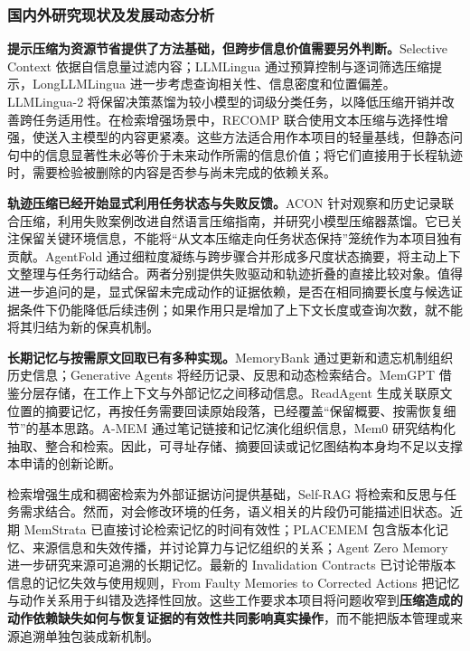 \subsubsection{国内外研究现状及发展动态分析}
\textbf{提示压缩为资源节省提供了方法基础，但跨步信息价值需要另外判断。}Selective Context 依据自信息量过滤内容\cite{selectivecontext}；LLMLingua 通过预算控制与逐词筛选压缩提示\cite{llmlingua}，LongLLMLingua 进一步考虑查询相关性、信息密度和位置偏差\cite{longllmlingua}。LLMLingua-2 将保留决策蒸馏为较小模型的词级分类任务，以降低压缩开销并改善跨任务适用性\cite{llmlingua2}。在检索增强场景中，RECOMP 联合使用文本压缩与选择性增强，使送入主模型的内容更紧凑\cite{recomp}。这些方法适合用作本项目的轻量基线，但静态问句中的信息显著性未必等价于未来动作所需的信息价值；将它们直接用于长程轨迹时，需要检验被删除的内容是否参与尚未完成的依赖关系。

\textbf{轨迹压缩已经开始显式利用任务状态与失败反馈。}ACON 针对观察和历史记录联合压缩，利用失败案例改进自然语言压缩指南，并研究小模型压缩器蒸馏\cite{acon}。它已关注保留关键环境信息，不能将“从文本压缩走向任务状态保持”笼统作为本项目独有贡献。AgentFold 通过细粒度凝练与跨步骤合并形成多尺度状态摘要，将主动上下文整理与任务行动结合\cite{agentfold}。两者分别提供失败驱动和轨迹折叠的直接比较对象。值得进一步追问的是，显式保留未完成动作的证据依赖，是否在相同摘要长度与候选证据条件下仍能降低后续违例；如果作用只是增加了上下文长度或查询次数，就不能将其归结为新的保真机制。

\textbf{长期记忆与按需原文回取已有多种实现。}MemoryBank 通过更新和遗忘机制组织历史信息\cite{memorybank}；Generative Agents 将经历记录、反思和动态检索结合\cite{generativeagents}。MemGPT 借鉴分层存储，在工作上下文与外部记忆之间移动信息\cite{memgpt}。ReadAgent 生成关联原文位置的摘要记忆，再按任务需要回读原始段落\cite{readagent}，已经覆盖“保留概要、按需恢复细节”的基本思路。A-MEM 通过笔记链接和记忆演化组织信息\cite{amem}，Mem0 研究结构化抽取、整合和检索\cite{mem0}。因此，可寻址存储、摘要回读或记忆图结构本身均不足以支撑本申请的创新论断。

检索增强生成和稠密检索为外部证据访问提供基础\cite{rag,dpr}，Self-RAG 将检索和反思与任务需求结合\cite{selfrag}。然而，对会修改环境的任务，语义相关的片段仍可能描述旧状态。近期 MemStrata 已直接讨论检索记忆的时间有效性\cite{memstrata}；PLACEMEM 包含版本化记忆、来源信息和失效传播，并讨论算力与记忆组织的关系\cite{placemem}；Agent Zero Memory 进一步研究来源可追溯的长期记忆\cite{agentzero}。最新的 Invalidation Contracts 已讨论带版本信息的记忆失效与使用规则\cite{invalidation}，From Faulty Memories to Corrected Actions 把记忆与动作关系用于纠错及选择性回放\cite{rollbackrepair}。这些工作要求本项目将问题收窄到\textbf{压缩造成的动作依赖缺失如何与恢复证据的有效性共同影响真实操作}，而不能把版本管理或来源追溯单独包装成新机制。

